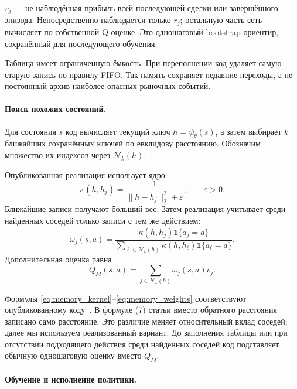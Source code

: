 \documentclass[9pt,a4paper,twocolumn]{extarticle}
\begin{document}
$v_j$ --- не наблюдённая прибыль всей последующей сделки или завершённого эпизода.
Непосредственно наблюдается только $r_j$; остальную часть сеть вычисляет по собственной
Q-оценке. Это одношаговый bootstrap-ориентир, сохранённый для последующего обучения.

Таблица имеет ограниченную ёмкость. При переполнении код удаляет самую старую запись по правилу
FIFO. Так память сохраняет недавние переходы, а не постоянный архив наиболее опасных рыночных
событий.

\paragraph{Поиск похожих состояний.}

Для состояния $s$ код вычисляет текущий ключ $h=\psi_\theta(s)$, а затем выбирает $k$ ближайших
сохранённых ключей по евклидову расстоянию. Обозначим множество их индексов через $\mathcal
N_k(h)$.

Опубликованная реализация использует ядро
\begin{equation}
  \kappa(h,h_j)
  =
  \frac{1}{\|h-h_j\|_2^2+\varepsilon},
  \qquad \varepsilon>0.
  \label{eq:memory_kernel}
\end{equation}
Ближайшие записи получают больший вес. Затем реализация учитывает среди найденных соседей только
записи с тем же действием:
\begin{equation}
  \omega_j(s,a)
  =
  \frac{
    \kappa(h,h_j)\mathbf 1\{a_j=a\}
  }{
    \displaystyle
    \sum_{\ell\in\mathcal N_k(h)}
    \kappa(h,h_\ell)\mathbf 1\{a_\ell=a\}
  }.
  \label{eq:memory_weights}
\end{equation}
Дополнительная оценка равна
\begin{equation}
  Q_M(s,a)
  =
  \sum_{j\in\mathcal N_k(h)}
  \omega_j(s,a)v_j.
  \label{eq:memory_estimate}
\end{equation}

Формулы \eqref{eq:memory_kernel}--\eqref{eq:memory_weights} соответствуют опубликованному
коду~\cite{macrohftcode}. В формуле (7) статьи вместо обратного расстояния записано само
расстояние. Это различие меняет относительный вклад соседей; далее мы используем реализованный
вариант. До заполнения таблицы или при отсутствии подходящего действия среди найденных соседей
код подставляет обычную одношаговую оценку вместо $Q_M$.

\paragraph{Обучение и исполнение политики.}
\end{document}
